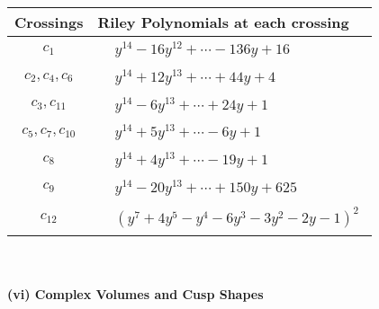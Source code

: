 \documentclass[1p]{elsarticle_modified}
\theoremstyle{definition}
\begin{document}
\begin{tabular}{m{50pt}|m{274pt}}
Crossings & \hspace{64pt}Riley Polynomials at each crossing \\
\hline $$\begin{aligned}c_{1}\end{aligned}$$&$\begin{aligned}
&y^{14}-16 y^{12}+\cdots-136 y+16
\end{aligned}$\\
\hline $$\begin{aligned}c_{2},c_{4},c_{6}\end{aligned}$$&$\begin{aligned}
&y^{14}+12 y^{13}+\cdots+44 y+4
\end{aligned}$\\
\hline $$\begin{aligned}c_{3},c_{11}\end{aligned}$$&$\begin{aligned}
&y^{14}-6 y^{13}+\cdots+24 y+1
\end{aligned}$\\
\hline $$\begin{aligned}c_{5},c_{7},c_{10}\end{aligned}$$&$\begin{aligned}
&y^{14}+5 y^{13}+\cdots-6 y+1
\end{aligned}$\\
\hline $$\begin{aligned}c_{8}\end{aligned}$$&$\begin{aligned}
&y^{14}+4 y^{13}+\cdots-19 y+1
\end{aligned}$\\
\hline $$\begin{aligned}c_{9}\end{aligned}$$&$\begin{aligned}
&y^{14}-20 y^{13}+\cdots+150 y+625
\end{aligned}$\\
\hline $$\begin{aligned}c_{12}\end{aligned}$$&$\begin{aligned}
&(y^7+4 y^5- y^4-6 y^3-3 y^2-2 y-1)^2
\end{aligned}$\\
\hline
\end{tabular}\\~\\
\newpage\flushleft \textbf{(vi) Complex Volumes and Cusp Shapes}
\end{document}
